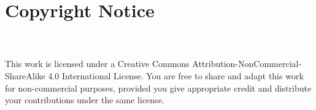 \documentclass[a4paper]{article}
\begin{document}
	\section*{Copyright Notice}
	\fbox{\Huge \ccbyncsa{}}\\\\
	This work is licensed under a Creative Commons Attribution-NonCommercial-ShareAlike 4.0 International License. You are free to share and adapt this work for non-commercial purposes, provided you give appropriate credit and distribute your contributions under the same license.\\\\
	
	\newpage
	
	
	\newpage
	\lstlistoflistings
	\newpage
	\listoffigures
	
\end{document}
